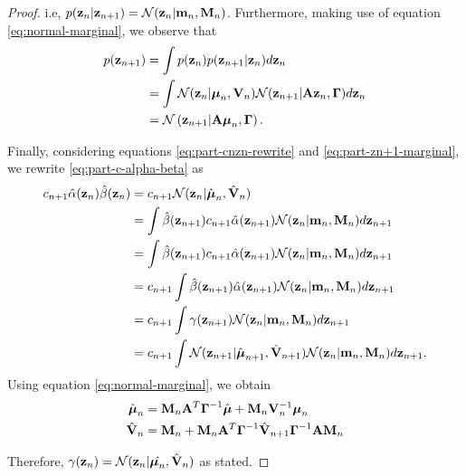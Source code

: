 \documentclass[11pt]{article}
\numberwithin{equation}{section}
\newcommand{\z}{{\bf z}}
\newcommand{\N}{\mathcal{N}}
\begin{document}
\begin{proof}
	i.e, $p(\z_n \vert \z_{n+1}) = \N(\z_n \vert {\bf m}_n, {\bf M}_n)$. Furthermore, making use of equation \eqref{eq:normal-marginal}, we observe that
	\begin{align}
		p(\z_{n+1}) &= \int p(\z_n) p(\z_{n+1} \vert \z_n) d\z_n\\
					&= \int \N(\z_n \vert\boldsymbol\mu_n, {\bf V}_n) \N(\z_{n+1} \vert {\bf A}\z_n, \boldsymbol\Gamma) d\z_n\\
					&= \N\left(\z_{n+1} \vert {\bf A}\boldsymbol\mu_n, \boldsymbol\Gamma\right) \label{eq:part-zn+1-marginal}.
	\end{align}
	
	Finally, considering equations \eqref{eq:part-cnzn-rewrite} and \eqref{eq:part-zn+1-marginal}, we rewrite \eqref{eq:part-c-alpha-beta} as
	\begin{align}
		c_{n+1}\hat\alpha(\z_n)\hat\beta(\z_n) &= c_{n+1} \N(\z_{n} \vert \hat{\boldsymbol\mu}_n, \hat{\bf V}_n)\\
		&= \int \hat\beta(\z_{n+1}) c_{n+1} \hat\alpha(\z_{n+1})\N(\z_n \vert {\bf m}_n, {\bf M}_n) d\z_{n+1}\\
		&= \int \hat\beta(\z_{n+1}) c_{n+1} \hat\alpha(\z_{n+1})\N(\z_n \vert {\bf m}_n, {\bf M}_n)d\z_{n+1}\\
		&= c_{n+1}\int \hat\beta(\z_{n+1}) \hat\alpha(\z_{n+1})\N(\z_n \vert {\bf m}_n, {\bf M}_n)d\z_{n+1}\\
		&= c_{n+1}\int \gamma(\z_{n+1})\N(\z_n \vert {\bf m}_n, {\bf M}_n) d\z_{n+1}\\
		&= c_{n+1}\int \N(\z_{n+1} \vert \hat{\boldsymbol\mu}_{n+1}, \hat{\bf V}_{n+1})\N(\z_n \vert {\bf m}_n, {\bf M}_n)d\z_{n+1}.\\
	\end{align}
	Using equation \eqref{eq:normal-marginal}, we obtain
	\begin{align}
		\hat{\boldsymbol{\mu}}_n &= {\bf M}_n {\bf A}^T \boldsymbol\Gamma ^{-1} \hat{\boldsymbol{\mu}} + {\bf M}_n {\bf V}_n^{-1} \boldsymbol\mu_n \label{eq:part-muhat-1}\\
		\hat{{\bf V}}_n&= {\bf M}_n + {\bf M}_n {\bf A}^T \boldsymbol{\Gamma}^{-1} \hat{\bf V}_{n+1}\boldsymbol\Gamma^{-1}{\bf A}{\bf M}_n \label{eq:part-Vhat-1}
	\end{align}
	
	Therefore, $\gamma(\z_n) = \N(\z_n \vert \hat{\boldsymbol{\mu}_n}, \hat {\bf V}_n)$ as stated. 
	

\end{proof}
\end{document}
